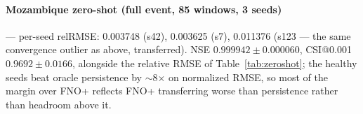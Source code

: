 \documentclass[11pt]{article}
\begin{document}
\paragraph{Mozambique zero-shot (full event, 85 windows, 3 seeds)} ---
per-seed relRMSE: 0.003748 (s42), 0.003625 (s7), 0.011376 (s123 --- the
same convergence outlier as above, transferred). NSE
$0.999942\pm0.000060$, CSI@0.001 $0.9692\pm0.0166$, alongside the
relative RMSE of Table~\ref{tab:zeroshot}; the healthy seeds beat oracle
persistence by $\sim$8$\times$ on normalized RMSE, so most of the margin
over FNO+ reflects FNO+ transferring worse than persistence rather than
headroom above it.



\end{document}
